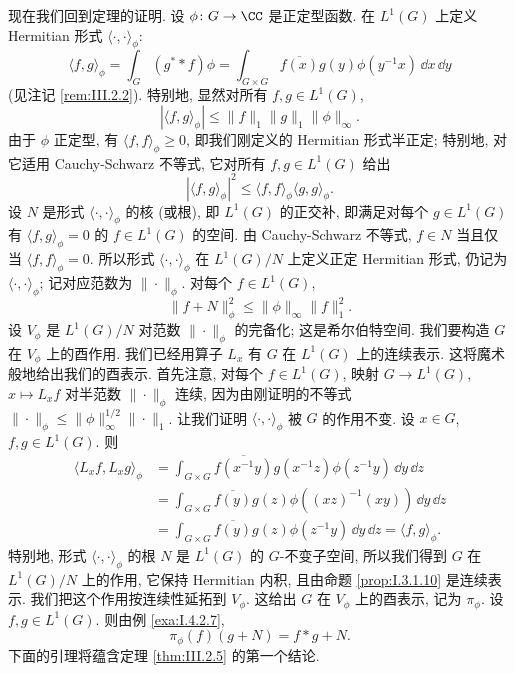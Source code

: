现在我们回到定理的证明. 设 $\phi \colon G \to \CC$ 是正定型函数. 在 $L^1(G)$ 上定义 Hermitian 形式 $\langle \cdot, \cdot \rangle_{\phi}$:
\[
\langle f, g \rangle_{\phi} = \int_G (g^* * f)\phi = \int_{G \times G}\overline{f(x)}g(y)\phi(y^{-1}x)\,\dd x\,\dd y
\]
(见注记 \ref{rem:III.2.2}). 特别地, 显然对所有 $f, g \in L^1(G)$,
\[
|\langle f, g \rangle_{\phi}| \leq \|f\|_1\|g\|_1\|\phi\|_{\infty}.
\]
由于 $\phi$ 正定型, 有 $\langle f, f \rangle_{\phi} \geq 0$, 即我们刚定义的 Hermitian 形式半正定; 特别地, 对它适用 Cauchy-Schwarz 不等式, 它对所有 $f, g \in L^1(G)$ 给出
\[
|\langle f, g \rangle_{\phi}|^2 \leq \langle f, f \rangle_{\phi}\langle g, g \rangle_{\phi}.
\]
设 $N$ 是形式 $\langle \cdot, \cdot \rangle_{\phi}$ 的核 (或根), 即 $L^1(G)$ 的正交补, 即满足对每个 $g \in L^1(G)$ 有 $\langle f, g \rangle_{\phi} = 0$ 的 $f \in L^1(G)$ 的空间. 由 Cauchy-Schwarz 不等式, $f \in N$ 当且仅当 $\langle f, f \rangle_{\phi} = 0$. 所以形式 $\langle \cdot, \cdot \rangle_{\phi}$ 在 $L^1(G)/N$ 上定义正定 Hermitian 形式, 仍记为 $\langle \cdot, \cdot \rangle_{\phi}$; 记对应范数为 $\|\cdot\|_{\phi}$. 对每个 $f \in L^1(G)$,
\[
\|f + N\|_{\phi}^2 \leq \|\phi\|_{\infty}\|f\|_1^2.
\]
设 $V_{\phi}$ 是 $L^1(G)/N$ 对范数 $\|\cdot\|_{\phi}$ 的完备化; 这是希尔伯特空间.
我们要构造 $G$ 在 $V_{\phi}$ 上的酉作用. 我们已经用算子 $L_x$ 有 $G$ 在 $L^1(G)$ 上的连续表示. 这将魔术般地给出我们的酉表示. 首先注意, 对每个 $f \in L^1(G)$, 映射 $G \to L^1(G)$, $x \longmapsto L_xf$ 对半范数 $\|\cdot\|_{\phi}$ 连续, 因为由刚证明的不等式 $\|\cdot\|_{\phi} \leq \|\phi\|_{\infty}^{1/2}\|\cdot\|_1$.
让我们证明 $\langle \cdot, \cdot \rangle_{\phi}$ 被 $G$ 的作用不变. 设 $x \in G$, $f, g \in L^1(G)$. 则
\begin{align*}
\langle L_xf, L_xg \rangle_{\phi} &= \int_{G \times G}\overline{f(x^{-1}y)}g(x^{-1}z)\phi(z^{-1}y)\,\dd y\,\dd z \\
&= \int_{G \times G}\overline{f(y)}g(z)\phi((xz)^{-1}(xy))\,\dd y\,\dd z \\
&= \int_{G \times G}\overline{f(y)}g(z)\phi(z^{-1}y)\,\dd y\,\dd z = \langle f, g \rangle_{\phi}.
\end{align*}
特别地, 形式 $\langle \cdot, \cdot \rangle_{\phi}$ 的根 $N$ 是 $L^1(G)$ 的 $G$-不变子空间, 所以我们得到 $G$ 在 $L^1(G)/N$ 上的作用, 它保持 Hermitian 内积, 且由命题 \ref{prop:I.3.1.10} 是连续表示. 我们把这个作用按连续性延拓到 $V_{\phi}$. 这给出 $G$ 在 $V_{\phi}$ 上的酉表示, 记为 $\pi_{\phi}$.
设 $f, g \in L^1(G)$. 则由例 \ref{exa:I.4.2.7},
\[
\pi_{\phi}(f)(g + N) = f * g + N.
\]
下面的引理将蕴含定理 \ref{thm:III.2.5} 的第一个结论.

